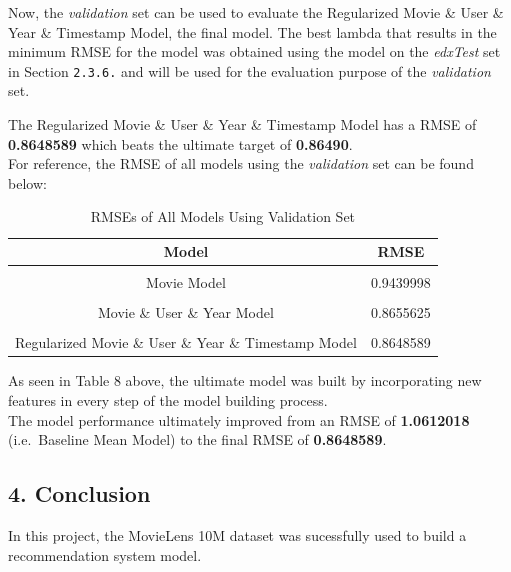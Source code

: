 \documentclass[
]{article}
\begin{document}
Now, the \emph{validation} set can be used to evaluate the Regularized
Movie \& User \& Year \& Timestamp Model, the final model. The best
lambda that results in the minimum RMSE for the model was obtained using
the model on the \emph{edxTest} set in Section \texttt{2.3.6.} and will
be used for the evaluation purpose of the \emph{validation} set.

The Regularized Movie \& User \& Year \& Timestamp Model has a RMSE of
\textbf{0.8648589} which beats the ultimate target of
\textbf{0.86490}.\\
For reference, the RMSE of all models using the \emph{validation} set
can be found below:

\begin{table}[H]

\caption{\label{tab:Table 8: Validation Results Table for All models}RMSEs of All Models Using Validation Set}
\centering
\fontsize{13}{15}\selectfont
\begin{tabular}[t]{|>{}c|||>{}c|}
\hline
Model & RMSE\\
\hline
\cellcolor{gray!6}{Baseline Mean Model} & \cellcolor{gray!6}{1.0612018}\\
\hline
Movie Model & 0.9439998\\
\hline
\cellcolor{gray!6}{Movie \& User Model} & \cellcolor{gray!6}{0.8659094}\\
\hline
Movie \& User \& Year Model & 0.8655625\\
\hline
\cellcolor{gray!6}{Movie \& User \& Year \& Timestamp Model} & \cellcolor{gray!6}{0.8654879}\\
\hline
Regularized Movie \& User \& Year \& Timestamp Model & 0.8648589\\
\hline
\end{tabular}
\end{table}

As seen in Table 8 above, the ultimate model was built by incorporating
new features in every step of the model building process.\\

The model performance ultimately improved from an RMSE of
\textbf{1.0612018} (i.e.~Baseline Mean Model) to the final RMSE of
\textbf{0.8648589}.

\hypertarget{conclusion}{%
\subsection{4. Conclusion}\label{conclusion}}

In this project, the MovieLens 10M dataset was sucessfully used to build
a recommendation system model.\\
\end{document}
